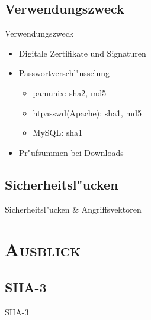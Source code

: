 \documentclass[xcolor=x11names,compress]{beamer}
\renewcommand{\(}{\begin{columns}}
\renewcommand{\)}{\end{columns}}
\newcommand{\<}[1]{\begin{column}{#1}}
\renewcommand{\>}{\end{column}}
\begin{document}
\subsection{Verwendungszweck}
\begin{frame}{Verwendungszweck}

\begin{itemize}
\item Digitale Zertifikate und Signaturen 
	\pause
\item Passwortverschl"usselung
\begin{itemize}
	\item pam\textunderscore unix: sha2, md5
	\item htpasswd(Apache): sha1, md5
	\item MySQL: sha1
\end{itemize}
\pause
\item Pr"ufsummen bei Downloads
\end{itemize}


\end{frame}
\subsection{Sicherheitsl"ucken}
\begin{frame}{Sicherheitsl"ucken \& Angriffsvektoren}

\end{frame}

\section{\scshape Ausblick}
\subsection{SHA-3}
\begin{frame}{SHA-3}

\end{frame}
\end{document}
